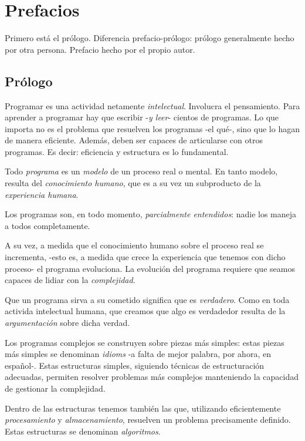 \setcounter{section}{-1} %

\section{Prefacios}

Primero está el prólogo.
Diferencia prefacio-prólogo: prólogo generalmente hecho por otra persona.
Prefacio hecho por el propio autor.

\subsection{Prólogo}

Programar es una actividad netamente \textit{intelectual}.
Involucra el pensamiento.
Para aprender a programar hay que escribir -\textit{y leer}- cientos de programas.
Lo que importa no es el problema que resuelven los programas -el qué-,
sino que lo hagan de manera eficiente.
Además, 
deben ser capaces de articularse con otros programas.
Es decir: eficiencia y estructura es lo fundamental.

Todo \textit{programa} es un \textit{modelo} de un proceso real o mental.
En tanto modelo, resulta del \textit{conocimiento humano}, que es a su vez un subproducto de la \textit{experiencia humana}.

Los programas son,
en todo momento,
\textit{parcialmente entendidos}:
nadie los maneja a todos completamente.

A su vez,
a medida que el conocimiento humano sobre el proceso real se incrementa,
-esto es, a medida que crece la experiencia que tenemos con dicho proceso-
el programa evoluciona.
La evolución del programa requiere que seamos capaces de lidiar con la \textit{complejidad}.

Que un programa sirva a su cometido significa que es \textit{verdadero}.
Como en toda activida intelectual humana,
que creamos que algo es verdadedor resulta de la \textit{argumentación} sobre dicha verdad.

Los programas complejos se construyen sobre piezas más simples: 
estas piezas más simples se denominan \textit{idioms}
-a falta de mejor palabra, por ahora, en español-.
Estas estructuras simples,
siguiendo técnicas de estructuración adecuadas,
permiten resolver problemas más complejos manteniendo la capacidad de gestionar la complejidad.

Dentro de las estructuras tenemos también las que,
utilizando eficientemente \textit{procesamiento} y \textit{almacenamiento},
resuelven un problema precisamente definido.
Estas estructuras se denominan \textit{algoritmos}.

